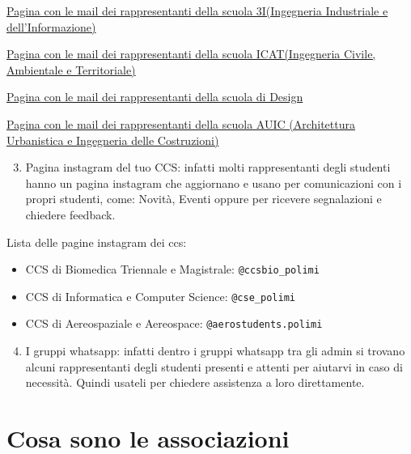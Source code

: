 \documentclass[legal]{polinetwork}
\begin{document}
\href{https://www.ingindinf.polimi.it/la-scuola/rappresentanti-degli-studenti}{Pagina con le mail dei rappresentanti della scuola 3I(Ingegneria Industriale e dell'Informazione)}

\href{https://www.ingcat.polimi.it/la-scuola/rappresentanti-degli-studenti}{Pagina con le mail dei rappresentanti della scuola ICAT(Ingegneria Civile, Ambientale e Territoriale)}

\href{https://www.design.polimi.it/la-scuola/rappresentanti-degli-studenti}{Pagina con le mail dei rappresentanti della scuola di Design}

\href{https://www.auic.polimi.it/la-scuola/rappresentanti-degli-studenti}{Pagina con le mail dei rappresentanti della scuola AUIC (Architettura Urbanistica e Ingegneria delle Costruzioni)}

\begin{enumerate}
  \setcounter{enumi}{2}
  \item Pagina instagram del tuo CCS: infatti molti rappresentanti degli studenti hanno un pagina instagram che aggiornano e usano per comunicazioni con i propri studenti, come: Novità, Eventi oppure per ricevere segnalazioni e chiedere feedback.
\end{enumerate}


Lista delle pagine instagram dei ccs:

\begin{itemize}
  \item CCS di Biomedica Triennale e Magistrale: \texttt{@ccsbio\_polimi}
  \item CCS di Informatica e Computer Science: \texttt{@cse\_polimi}
  \item CCS di Aereospaziale e Aereospace: \texttt{@aerostudents.polimi}
\end{itemize}


\begin{enumerate}
  \setcounter{enumi}{3}
  \item I gruppi whatsapp: infatti dentro i gruppi whatsapp tra gli admin si trovano alcuni rappresentanti degli studenti presenti e attenti per aiutarvi in caso di necessità. Quindi usateli per chiedere assistenza a loro direttamente.
\end{enumerate}



\section{Cosa sono le associazioni}
\end{document}
